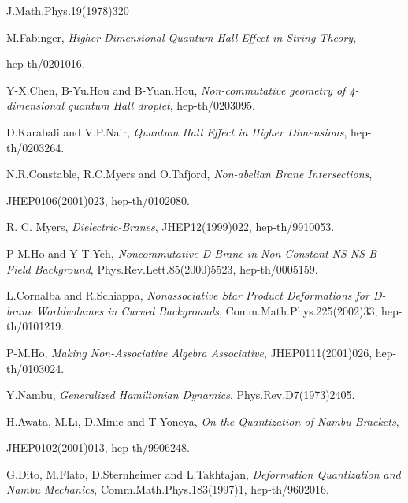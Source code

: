 \documentclass[a4paper,11pt]{article}
\begin{document}
\begin{thebibliography}{99}
J.Math.Phys.19(1978)320

M.Fabinger, 
{\it Higher-Dimensional Quantum Hall Effect in String Theory}, 

hep-th/0201016. 

Y-X.Chen, B-Yu.Hou and B-Yuan.Hou, 
{\it Non-commutative geometry of 4-dimensional quantum Hall droplet}, 
hep-th/0203095.  

D.Karabali and V.P.Nair, 
{\it Quantum Hall Effect in Higher Dimensions}, 
hep-th/0203264.  

N.R.Constable, R.C.Myers and O.Tafjord, 
{\it Non-abelian Brane Intersections}, 

JHEP0106(2001)023, 
hep-th/0102080. 

R. C. Myers, 
{\it Dielectric-Branes}, 
JHEP12(1999)022, hep-th/9910053. 

P-M.Ho and Y-T.Yeh, 
{\it Noncommutative D-Brane in Non-Constant NS-NS B Field Background}, 
Phys.Rev.Lett.85(2000)5523, 
hep-th/0005159. 


L.Cornalba and R.Schiappa, 
{\it Nonassociative Star Product Deformations for D-brane 
Worldvolumes in Curved Backgrounds}, 
Comm.Math.Phys.225(2002)33, hep-th/0101219. 

P-M.Ho, 
{\it Making Non-Associative Algebra Associative}, 
JHEP0111(2001)026, hep-th/0103024.  

Y.Nambu, 
{\it Generalized Hamiltonian Dynamics}, 
Phys.Rev.D7(1973)2405.

H.Awata, M.Li, D.Minic and T.Yoneya, 
{\it On the Quantization of Nambu Brackets}, 

JHEP0102(2001)013, hep-th/9906248. 

G.Dito, M.Flato, D.Sternheimer and L.Takhtajan, 
{\it Deformation Quantization and Nambu Mechanics}, 
Comm.Math.Phys.183(1997)1, hep-th/9602016.  



%

\end{thebibliography}
\end{document}
